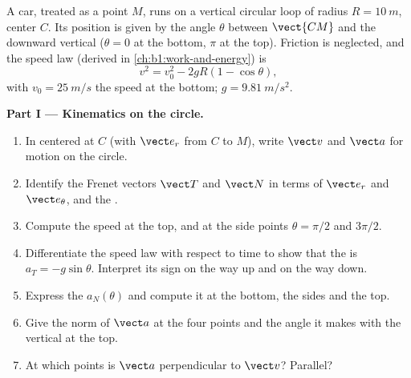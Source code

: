 \begin{problem}
\label{pb:b1:point-kinematics:1}
A car, treated as a point $M$, runs on a vertical circular loop of
radius $R = \qty{10}{m}$, center $C$. Its position is given by the
angle $\theta$ between $\vect{CM}$ and the downward vertical ($\theta =
0$ at the bottom, $\pi$ at the top). Friction is neglected, and the
speed law (derived in \cref{ch:b1:work-and-energy}) is
\[
v^2 = v_0^2 - 2gR(1 - \cos\theta),
\]
with $v_0 = \qty{25}{m/s}$ the speed at the bottom; $g = \qty{9.81}{m/s^2}$.

\medskip
\noindent\textbf{Part I --- Kinematics on the circle.}
\begin{enumerate}
  \item In  centered at $C$ (with $\vect e_r$ from $C$
        to $M$), write $\vect v$ and $\vect a$ for motion on the circle.
  \item Identify the Frenet vectors $\vect T$ and $\vect N$ in terms of
        $\vect e_r$ and $\vect e_\theta$, and the .
  \item Compute the speed at the top, and at the side points
        $\theta = \pi/2$ and $3\pi/2$.
  \item Differentiate the speed law with respect to time to show that
        the  is $a_T = -g\sin\theta$. Interpret
        its sign on the way up and on the way down.
  \item Express the  $a_N(\theta)$ and compute it at
        the bottom, the sides and the top.
  \item Give the norm of $\vect a$ at the four points and the angle it
        makes with the vertical at the top.
  \item At which points is $\vect a$ perpendicular to $\vect v$? Parallel?
\end{enumerate}


\end{problem}
